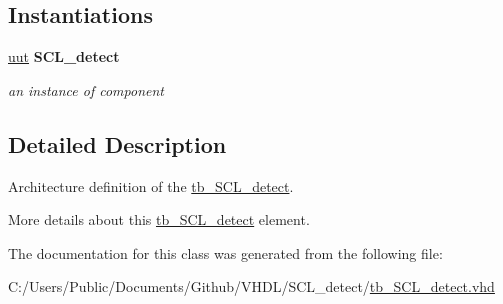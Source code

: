 \subsection*{Instantiations}
 \begin{DoxyCompactItemize}
\item 
\hyperlink{classtb___s_c_l__detect_1_1_behavioral_a1619316ad715601eb5d3559db829ac05}{uut}  {\bfseries S\+C\+L\+\_\+detect}   \hypertarget{classtb___s_c_l__detect_1_1_behavioral_a1619316ad715601eb5d3559db829ac05}{}\label{classtb___s_c_l__detect_1_1_behavioral_a1619316ad715601eb5d3559db829ac05}

\begin{DoxyCompactList}\small\item\em an instance of component \end{DoxyCompactList}\end{DoxyCompactItemize}


\subsection{Detailed Description}
Architecture definition of the \hyperlink{classtb___s_c_l__detect}{tb\+\_\+\+S\+C\+L\+\_\+detect}. 

More details about this \hyperlink{classtb___s_c_l__detect}{tb\+\_\+\+S\+C\+L\+\_\+detect} element. 

The documentation for this class was generated from the following file\+:\begin{DoxyCompactItemize}
\item 
C\+:/\+Users/\+Public/\+Documents/\+Github/\+V\+H\+D\+L/\+S\+C\+L\+\_\+detect/\hyperlink{tb___s_c_l__detect_8vhd}{tb\+\_\+\+S\+C\+L\+\_\+detect.\+vhd}\end{DoxyCompactItemize}
